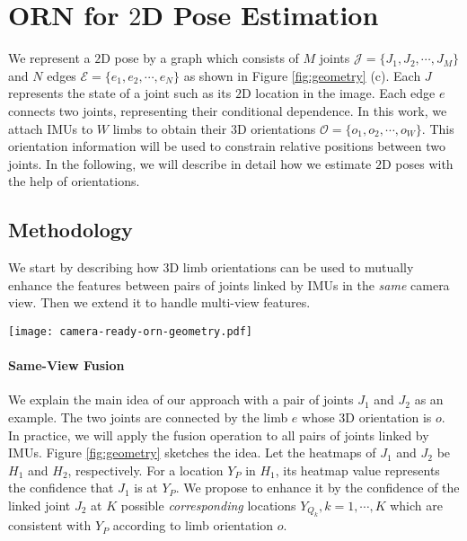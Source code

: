 \documentclass[10pt,twocolumn,letterpaper]{article}
\begin{document}
\section{ORN for $2$D Pose Estimation}
We represent a $2$D pose by a graph which consists of $M$ joints $\mathcal{J}=\{{J}_1, {J}_2, \cdots, {J}_M \}$ and $N$ edges $\mathcal{E}=\{{e}_1, {e}_2, \cdots, {e}_N\}$ as shown in Figure \ref{fig:geometry} (c). Each ${J}$ represents the state of a joint such as its $2$D location in the image. Each edge ${e}$ connects two joints, representing their conditional dependence. In this work, we attach IMUs to ${W}$ limbs to obtain their $3$D orientations $\mathcal{O}=\{{o}_1, {o}_2, \cdots, {o}_W\}$. This orientation information will be used to constrain relative positions between two joints. In the following, we will describe in detail how we estimate $2$D poses with the help of orientations.


\subsection{Methodology}
We start by describing how $3$D limb orientations can be used to mutually enhance the features between pairs of joints linked by IMUs in the \emph{same} camera view. Then we extend it to handle multi-view features.
\begin{figure*}[tp]
	\centering
	\texttt{[image: camera-ready-orn-geometry.pdf]}
	\caption{Illustration of the cross-joint-fusion idea in ORN. (a) For a location ${Y}_{P}$ in ${H}_1$, we estimate its $3$D points ${P}_k$ lying on the line defined by the camera center ${C}_1$ and ${Y}_{P}$. Then based on the $3$D limb orientation provided by IMU and the limb length, we get candidate $3$D locations of ${J}_2$ which are denoted as ${Q}_k$. We project ${Q}_k$ to the image as ${Y}_{{Q}_{k}}$ and get the corresponding heatmap confidence. If the confidence is high, ${J}_1$ has high confidence being located at ${Y}_{P}$. (b) We enhance the initial confidence of ${J}_1$ at ${Y}_{{P}}$ with the confidence of ${J}_2$ at ${Y}_{{Q}_k}$ in all views. Similarly, we can fuse the heatmap of ${J}_2$ using that of ${J}_1$. (c) We show the skeleton model used in this work. }
	\label{fig:geometry}
\end{figure*}

\paragraph{Same-View Fusion}
We explain the main idea of our approach with a pair of joints ${J}_1$ and ${J}_2$ as an example. The two joints are connected by the limb ${e}$ whose $3$D orientation is ${o}$. In practice, we will apply the fusion operation to all pairs of joints linked by IMUs. Figure \ref{fig:geometry} sketches the idea. Let the heatmaps of ${J}_1$ and ${J}_2$ be ${H}_1$ and ${H}_2$, respectively. For a location ${Y}_{{P}}$ in ${H}_1$, its heatmap value represents the confidence that ${J}_1$ is at ${Y}_{{P}}$. We propose to enhance it by the confidence of the linked joint ${J}_2$ at $K$ possible \emph{corresponding} locations ${Y}_{{Q}_k}, k=1, \cdots, K$ which are consistent with ${Y}_{{P}}$ according to limb orientation ${o}$. 
\end{document}
